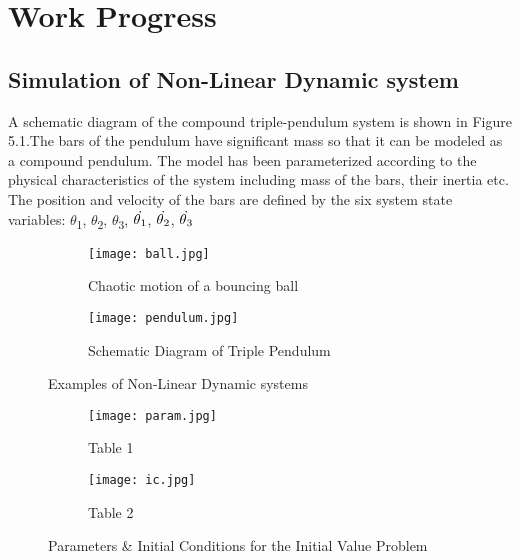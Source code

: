 \chapter{Work Progress}
\label{chap:work}
\setlength{\parskip}{1.5mm}
\section{Simulation of Non-Linear Dynamic system}
A schematic diagram of the compound triple-pendulum system is shown in Figure 5.1.The bars of the pendulum have significant mass so that it can be modeled as a compound pendulum. The model has been parameterized according to the physical characteristics of the system including mass of the bars, their inertia etc. 
The position and velocity of the bars are defined by the six system state variables: $\theta$\textsubscript{1}, $\theta$\textsubscript{2}, $\theta$\textsubscript{3}, ${\dot{\theta\textsubscript{1}}}$, ${\dot{\theta\textsubscript{2}}}$, ${\dot{\theta\textsubscript{3}}}$

% 

\begin{figure}[H]
\begin{subfigure}{0.5\textwidth}
\texttt{[image: ball.jpg]}
\caption{Chaotic motion of a bouncing ball}\label{fig:ball}
\end{subfigure}
\begin{subfigure}{0.5\textwidth}
\texttt{[image: pendulum.jpg]}
\caption{Schematic Diagram of Triple Pendulum}\label{fig:pendulum}
\end{subfigure}
\caption{Examples of Non-Linear Dynamic systems}\label{fig:image0}

\end{figure}
\begin{figure}[h]
\begin{subfigure}{0.5\textwidth}
\texttt{[image: param.jpg]}
\caption{Table 1}\label{fig:param}
\end{subfigure}
\begin{subfigure}{0.5\textwidth}
\texttt{[image: ic.jpg]}
\caption{Table 2}\label{fig:ic}
\end{subfigure}
\caption{Parameters \& Initial Conditions for the Initial Value Problem}\label{fig:image1}
\end{figure}

